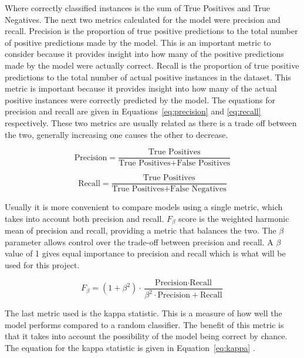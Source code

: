 Where correctly classified instances is the sum of True Positives and True Negatives. The next two metrics calculated for the model were precision and recall. Precision is the proportion of true positive predictions to the total number of positive predictions made by the model. This is an important metric to consider because it provides insight into how many of the positive predictions made by the model were actually correct. Recall is the proportion of true positive predictions to the total number of actual positive instances in the dataset. This metric is important because it provides insight into how many of the actual positive instances were correctly predicted by the model. The equations for precision and recall are given in Equations~\ref{eq:precision} and \ref{eq:recall} respectively. These two metrics are usually related as there is a trade off between the two, generally increasing one causes the other to decrease.

\begin{equation}
    \label{eq:precision}
    \text{Precision} = \frac{\text{True Positives}}{\text{True Positives} + \text{False Positives}}
\end{equation}


\begin{equation}
    \label{eq:recall}
    \text{Recall} = \frac{\text{True Positives}}{\text{True Positives} + \text{False Negatives}}
\end{equation}


Usually it is more convenient to compare models using a single metric, which takes into account both precision and recall. $F_{\beta}$ score is the weighted harmonic mean of precision and recall, providing a metric that balances the two. The $\beta$ parameter allows control over the trade-off between precision and recall.  A $\beta$ value of 1 gives equal importance to precision and recall which is what will be used for this project. 

\begin{equation}
    \label{eq:f1}
    F_{\beta} = (1 + \beta^2) \cdot \frac{\text{Precision} \cdot \text{Recall}}{\beta^2 \cdot \text{Precision} + \text{Recall}}
\end{equation}

The last metric used is the kappa statistic. This is a measure of how well the model performs compared to a random classifier. The benefit of this metric is that it takes into account the possibility of the model being correct by chance. The equation for the kappa statistic is given in Equation~\ref{eq:kappa} .

